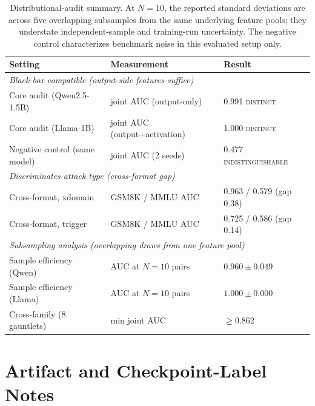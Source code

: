 \documentclass{article}
\begin{document}
\begin{table}[h]
\begin{center}
\small
\begin{tabular}{lll}
\toprule
\textbf{Setting} & \textbf{Measurement} & \textbf{Result} \\
\midrule
\multicolumn{3}{l}{\textit{Black-box compatible (output-side features suffice)}} \\
\quad Core audit (Qwen2.5-1.5B)      & joint AUC (output-only)        & 0.991 \textsc{distinct} \\
\quad Core audit (Llama-1B)          & joint AUC (output+activation)  & 1.000 \textsc{distinct} \\
\quad Negative control (same model)  & joint AUC (2 seeds)            & 0.477 \textsc{indistinguishable} \\
\midrule
\multicolumn{3}{l}{\textit{Discriminates attack type (cross-format gap)}} \\
\quad Cross-format, xdomain          & GSM8K / MMLU AUC               & 0.963 / 0.579 (gap 0.38) \\
\quad Cross-format, trigger          & GSM8K / MMLU AUC               & 0.725 / 0.586 (gap 0.14) \\
\midrule
\multicolumn{3}{l}{\textit{Subsampling analysis (overlapping draws from one feature pool)}} \\
\quad Sample efficiency (Qwen)       & AUC at $N=10$ pairs            & $0.960 \pm 0.049$ \\
\quad Sample efficiency (Llama)      & AUC at $N=10$ pairs            & $1.000 \pm 0.000$ \\
\quad Cross-family (8 gauntlets)     & min joint AUC                  & $\geq 0.862$ \\
\bottomrule
\end{tabular}
\end{center}
\caption{Distributional-audit summary. At $N=10$, the reported standard deviations are across five overlapping subsamples from the same underlying feature pools; they understate independent-sample and training-run uncertainty. The negative control characterizes benchmark noise in this evaluated setup only.}
\label{tab:distrib-summary}
\end{table}


\section{Artifact and Checkpoint-Label Notes}
\label{app:artifacts}
\end{document}
